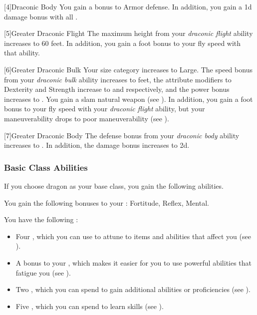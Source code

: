             [4]{Draconic Body} You gain a  bonus to Armor defense.
            In addition, you gain a \plus1d damage bonus with all .

            [5]{Greater Draconic Flight} The maximum height from your \textit{draconic flight} ability increases to 60 feet.
            In addition, you gain a  foot bonus to your fly speed with that ability.

            [6]{Greater Draconic Bulk} Your size category increases to Large.
            The speed bonus from your \textit{draconic bulk} ability increases to  feet, the attribute modifiers to Dexterity and Strength increase to  and  respectively, and the power bonus increases to .
            You gain a slam natural weapon (see ).
            In addition, you gain a  foot bonus to your fly speed with your \textit{draconic flight} ability, but your maneuverability drops to poor maneuverability (see ).

            [7]{Greater Draconic Body} The defense bonus from your \textit{draconic body} ability increases to .
            In addition, the damage bonus increases to \plus2d.

        \subsubsection{Basic Class Abilities}
            If you choose dragon as your base class, you gain the following abilities.

            You gain the following bonuses to your :  Fortitude,  Reflex,  Mental.

             You have the following :
            \begin{itemize}
                \item Four , which you can use to attune to items and abilities that affect you (see ).
                \item A  bonus to your , which makes it easier for you to use powerful abilities that fatigue you (see ).
                \item Two , which you can spend to gain additional abilities or proficiencies (see ).
                \item Five , which you can spend to learn skills (see ).
            \end{itemize}

